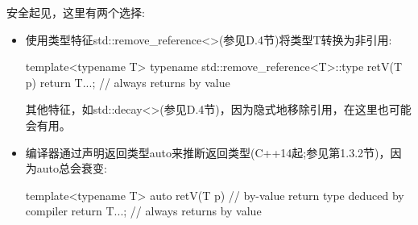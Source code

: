 安全起见，这里有两个选择:

\begin{itemize}
\item 
使用类型特征std::remove\_reference<>(参见D.4节)将类型T转换为非引用:

\begin{cpp}
template<typename T>
typename std::remove_reference<T>::type retV(T p)
{
	return T{...}; // always returns by value
}
\end{cpp}

其他特征，如std::decay<>(参见D.4节)，因为隐式地移除引用，在这里也可能会有用。

\item 
编译器通过声明返回类型auto来推断返回类型(C++14起;参见第1.3.2节)，因为auto总会衰变:

\begin{cpp}
template<typename T>
auto retV(T p) // by-value return type deduced by compiler
{
	return T{...}; // always returns by value
}
\end{cpp}

\end{itemize}


















